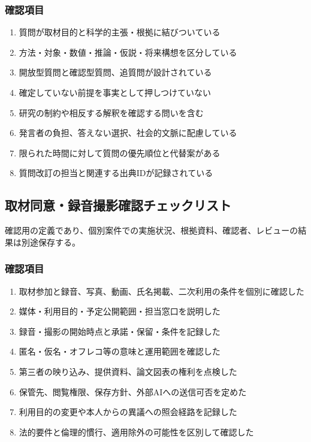 \documentclass[a4paper,11pt]{article}
\begin{document}
\subsubsection*{確認項目}
\begin{enumerate}[leftmargin=2em,itemsep=0.3em]
\item 質問が取材目的と科学的主張・根拠に結びついている\par
\item 方法・対象・数値・推論・仮説・将来構想を区分している\par
\item 開放型質問と確認型質問、追質問が設計されている\par
\item 確定していない前提を事実として押しつけていない\par
\item 研究の制約や相反する解釈を確認する問いを含む\par
\item 発言者の負担、答えない選択、社会的文脈に配慮している\par
\item 限られた時間に対して質問の優先順位と代替案がある\par
\item 質問改訂の担当と関連する出典IDが記録されている\par
\end{enumerate}
\subsection{取材同意・録音撮影確認チェックリスト}
\par 確認用の定義であり、個別案件での実施状況、根拠資料、確認者、レビューの結果は別途保存する。\par\medskip
\subsubsection*{確認項目}
\begin{enumerate}[leftmargin=2em,itemsep=0.3em]
\item 取材参加と録音、写真、動画、氏名掲載、二次利用の条件を個別に確認した\par
\item 媒体・利用目的・予定公開範囲・担当窓口を説明した\par
\item 録音・撮影の開始時点と承諾・保留・条件を記録した\par
\item 匿名・仮名・オフレコ等の意味と運用範囲を確認した\par
\item 第三者の映り込み、提供資料、論文図表の権利を点検した\par
\item 保管先、閲覧権限、保存方針、外部AIへの送信可否を定めた\par
\item 利用目的の変更や本人からの異議への照会経路を記録した\par
\item 法的要件と倫理的慣行、適用除外の可能性を区別して確認した\par
\end{enumerate}
\end{document}
